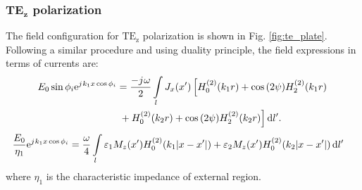 \documentclass[12pt]{article}
\begin{document}
\subsubsection{$\mathbf{TE_z}$ polarization}
%
The field configuration for $\mathrm{TE_z}$ polarization is shown in Fig. \ref{fig:te_plate}. Following a similar procedure and using duality principle, the field expressions in terms of currents are:
%
\begin{align}
  E_0 \sin \phi_i  \mathrm{e}^{{j}\mkern1mu k_1 x \cos \phi_i} &=  \frac{-{j}\mkern1mu \omega}{2} \int\limits_{l} J_x(x') \left[ H_0^{(2)}(k_1 r) + \cos {(2 \psi)} H_2^{(2)}(k_1 r) \right. \notag\\
  & \left. {} + H_0^{(2)}(k_2 r) + \cos {(2\psi)} H_2^{(2)}(k_2 r)\right]\mathop{}\!\mathrm{d}{l'}.
  \label{eq:J_final}
\end{align}
%
\begin{align}
  \frac{E_0}{\eta_1} \mathrm{e}^{{j}\mkern1mu k_1 x \cos \phi_i} &=  \frac{\omega}{4} \int\limits_{l} \varepsilon_1 M_z(x') H_0^{(2)}(k_1 |x - x'|)  +  \varepsilon_2 M_z(x') H_0^{(2)}(k_2 |x - x'|) \mathop{}\!\mathrm{d}{l'}
  \label{eq:scalarH_final}
\end{align}
%
where $\eta_1$ is the characteristic impedance of external region.
\end{document}
